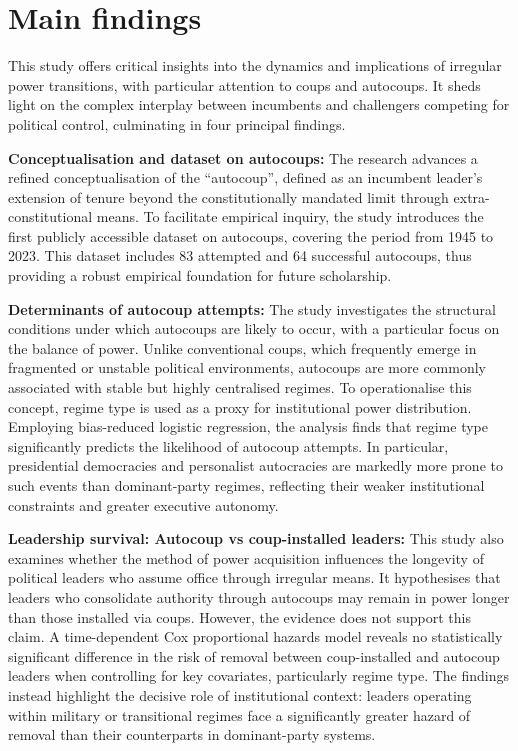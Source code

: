 \documentclass[
  12pt,
]{report}
\begin{document}
\section{Main findings}\label{main-findings}

This study offers critical insights into the dynamics and implications
of irregular power transitions, with particular attention to coups and
autocoups. It sheds light on the complex interplay between incumbents
and challengers competing for political control, culminating in four
principal findings.

\textbf{Conceptualisation and dataset on autocoups:} The research
advances a refined conceptualisation of the ``autocoup'', defined as an
incumbent leader's extension of tenure beyond the constitutionally
mandated limit through extra-constitutional means. To facilitate
empirical inquiry, the study introduces the first publicly accessible
dataset on autocoups, covering the period from 1945 to 2023. This
dataset includes 83 attempted and 64 successful autocoups, thus
providing a robust empirical foundation for future scholarship.

\textbf{Determinants of autocoup attempts:} The study investigates the
structural conditions under which autocoups are likely to occur, with a
particular focus on the balance of power. Unlike conventional coups,
which frequently emerge in fragmented or unstable political
environments, autocoups are more commonly associated with stable but
highly centralised regimes. To operationalise this concept, regime type
is used as a proxy for institutional power distribution. Employing
bias-reduced logistic regression, the analysis finds that regime type
significantly predicts the likelihood of autocoup attempts. In
particular, presidential democracies and personalist autocracies are
markedly more prone to such events than dominant-party regimes,
reflecting their weaker institutional constraints and greater executive
autonomy.

\textbf{Leadership survival: Autocoup vs coup-installed leaders:} This
study also examines whether the method of power acquisition influences
the longevity of political leaders who assume office through irregular
means. It hypothesises that leaders who consolidate authority through
autocoups may remain in power longer than those installed via coups.
However, the evidence does not support this claim. A time-dependent Cox
proportional hazards model reveals no statistically significant
difference in the risk of removal between coup-installed and autocoup
leaders when controlling for key covariates, particularly regime type.
The findings instead highlight the decisive role of institutional
context: leaders operating within military or transitional regimes face
a significantly greater hazard of removal than their counterparts in
dominant-party systems.
\end{document}
